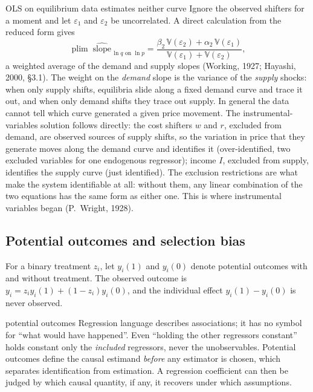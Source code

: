 \documentclass[11pt,a4paper]{article}
\newcommand{\V}{\mathbb{V}}
\newcommand{\plim}{\operatorname*{plim}}
\begin{document}
\begin{whybox}{OLS on equilibrium data estimates neither curve}
Ignore the observed shifters for a moment and let $\varepsilon_1$ and $\varepsilon_2$ be uncorrelated. A direct calculation from the reduced form gives
\[
\plim\;\widehat{\text{slope}}_{\,\ln q\text{ on }\ln p}=\frac{\beta_2\,\V(\varepsilon_2)+\alpha_2\,\V(\varepsilon_1)}{\V(\varepsilon_1)+\V(\varepsilon_2)},
\]
a weighted average of the demand and supply slopes (Working, 1927; Hayashi, 2000, \S3.1). The weight on the \emph{demand} slope is the variance of the \emph{supply} shocks: when only supply shifts, equilibria slide along a fixed demand curve and trace it out, and when only demand shifts they trace out supply. In general the data cannot tell which curve generated a given price movement. The instrumental-variables solution follows directly: the cost shifters $w$ and $r$, excluded from demand, are observed sources of supply shifts, so the variation in price that they generate moves along the demand curve and identifies it (over-identified, two excluded variables for one endogenous regressor); income $I$, excluded from supply, identifies the supply curve (just identified). The exclusion restrictions are what make the system identifiable at all: without them, any linear combination of the two equations has the same form as either one. This is where instrumental variables began (P.~Wright, 1928).
\end{whybox}

\subsection{Potential outcomes and selection bias}\label{sec:po}

For a binary treatment $z_i$, let $y_i(1)$ and $y_i(0)$ denote potential outcomes with and without treatment. The observed outcome is $y_i=z_iy_i(1)+(1-z_i)y_i(0)$, and the individual effect $y_i(1)-y_i(0)$ is never observed.

\begin{whybox}{potential outcomes}
Regression language describes associations; it has no symbol for ``what would have happened''. Even ``holding the other regressors constant'' holds constant only the \emph{included} regressors, never the unobservables. Potential outcomes define the causal estimand \emph{before} any estimator is chosen, which separates identification from estimation. A regression coefficient can then be judged by which causal quantity, if any, it recovers under which assumptions.
\end{whybox}
\end{document}
